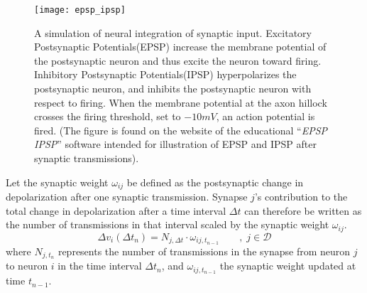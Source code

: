 \begin{figure}[hbt!p]
	\centering
	\texttt{[image: epsp\_ipsp]}
	\caption[Illustration of neural integration of synaptic input]{
			A simulation of neural integration of synaptic input. 
			Excitatory Postsynaptic Potentials(EPSP) increase the membrane potential of the postsynaptic neuron and thus excite the neuron toward firing.
			Inhibitory Postsynaptic Potentials(IPSP) hyperpolarizes the postsynaptic neuron, and inhibits the postsynaptic neuron with respect to firing.
			When the membrane potential at the axon hillock crosses the firing threshold, set to $-10mV$, an action potential is fired.
			(The figure is found on the website of the educational ``\emph{EPSP IPSP}'' software intended for illustration of EPSP and IPSP after synaptic transmissions).
				}
	\label{figIllustrationOfEPSPandIPSP}
\end{figure}


	Let the synaptic weight $\omega_{ij}$ be defined as the postsynaptic change in depolarization after one synaptic transmission. 	
	Synapse $j$'s contribution to the total change in depolarization after a time interval $\Delta t$ can therefore be written as the number of transmissions in that interval scaled by the synaptic weight $\omega_{ij}$.
	\begin{equation}
		\Delta v_{i}(\Delta t_n) = N_{j,\Delta t}\cdot\omega_{ij, t_{n-1}} \qquad,\; j\in\mathscr{D}%
	\end{equation}
	where $N_{j,t_n}$ represents the number of transmissions in the synapse from neuron $j$ to neuron $i$ in the time interval $\Delta t_n$, 
	and $\omega_{ij,t_{n-1}}$ the synaptic weight updated at time $t_{n-1}$.

